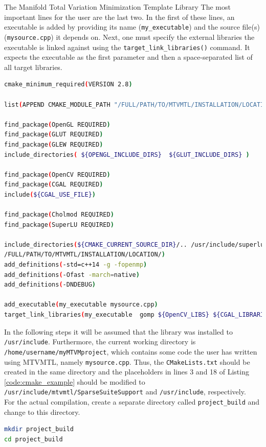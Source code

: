 \begin{chapter}{The Manifold Total Variation Minimization Template Library}
The most important lines for the user are the last two. In the first of these lines, an executable is added by providing its name (\texttt{my\_executable}) and the source file(s) (\texttt{mysource.cpp}) it depends on. Next, one must specify the external libraries the executable is linked against using the \texttt{target\_link\_libraries()} command. It expects the executable
as the first parameter and then a space-separated list of all target libraries. \\

\begin{lstlisting}[language=bash,label=code:cmake_example,caption={Example CMakeLists.txt}]
cmake_minimum_required(VERSION 2.8)

list(APPEND CMAKE_MODULE_PATH "/FULL/PATH/TO/MTVMTL/INSTALLATION/LOCATION/include/mtvmtl/SparseSuiteSupport")

find_package(OpenGL REQUIRED)
find_package(GLUT REQUIRED)
find_package(GLEW REQUIRED)
include_directories( ${OPENGL_INCLUDE_DIRS}  ${GLUT_INCLUDE_DIRS} )

find_package(OpenCV REQUIRED)
find_package(CGAL REQUIRED)
include(${CGAL_USE_FILE})

find_package(Cholmod REQUIRED)
find_package(SuperLU REQUIRED)

include_directories(${CMAKE_CURRENT_SOURCE_DIR}/.. /usr/include/superlu /usr/include/eigen3 
/FULL/PATH/TO/MTVMTL/INSTALLATION/LOCATION/)
add_definitions(-std=c++14 -g -fopenmp)
add_definitions(-Ofast -march=native)
add_definitions(-DNDEBUG)

add_executable(my_executable mysource.cpp)
target_link_libraries(my_executable  gomp ${OpenCV_LIBS} ${CGAL_LIBRARIES} ${CHOLMOD_LIBRARIES} ${SUPERLU_LIBRARIES} ${OPENGL_LIBRARIES} ${GLUT_LIBRARY} ${GLEW_LIBRARIES})
\end{lstlisting}

In the following steps it will be assumed that the library was installed to \texttt{/usr/include}. Furthermore,
the current working directory is \texttt{/home/username/myMTVMproject}, which contains some code the user has written
using MTVMTL, namely \texttt{mysource.cpp}. Thus, the \texttt{CMakeLists.txt} should be created in the same directory and the placeholders in lines 3 and 18 of Listing \ref{code:cmake_example} should be modified to 
\texttt{/usr/include/mtvmtl/SparseSuiteSupport} and \texttt{/usr/include}, respectively.\\

For the actual compilation, create a separate directory called \texttt{project\_build} and change to this directory.
\begin{lstlisting}[language=bash]
mkdir project_build
cd project_build
\end{lstlisting}


\end{chapter}
